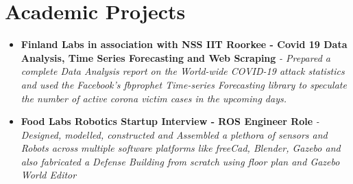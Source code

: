\documentclass{article}
\begin{document}
    \section*{Academic Projects}
    \begin{itemize}
        \item{\textbf{\large{Finland Labs in association with NSS IIT Roorkee - Covid 19 Data Analysis, Time Series Forecasting and Web Scraping}}}
        \newline
        \textit{- Prepared a complete Data Analysis report on the World-wide COVID-19 attack statistics and used the Facebook's fbprophet Time-series Forecasting library to speculate the number of active corona victim cases in the upcoming days.}  
    
        \item{\textbf{\large{Food Labs Robotics Startup Interview - ROS Engineer Role}}}
        \newline
        \textit{- Designed, modelled, constructed and
        Assembled a plethora of sensors and Robots across multiple software platforms like
        freeCad, Blender, Gazebo and also fabricated a Defense Building from scratch using floor plan and Gazebo World Editor}
    

\end{itemize}
\end{document}
